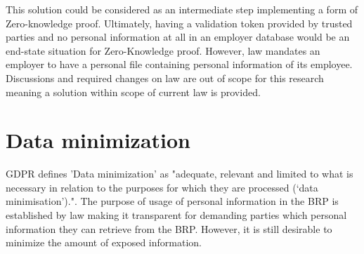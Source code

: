 This solution could be considered as an intermediate step implementing a form of Zero-knowledge proof. Ultimately, having a validation token provided by trusted parties and no personal information at all in an employer database would be an end-state situation for Zero-Knowledge proof. However, law mandates an employer to have a personal file containing personal information of its employee. Discussions and required changes on law are out of scope for this research meaning a solution within scope of current law is provided.
\clearpage

\section{Data minimization} \label{data-minimization}

GDPR \cite{GDPR} defines 'Data minimization' as "adequate, relevant and limited to what is necessary in relation to the purposes for which they are processed (‘data minimisation’).". The purpose of usage of personal information in the BRP is established by law making it transparent for demanding parties which personal information they can retrieve from the BRP. However, it is still desirable to minimize the amount of exposed information.

